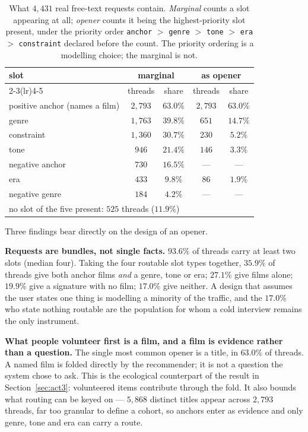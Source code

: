 \documentclass[11pt]{article}
\begin{document}
\begin{table}[t]
\centering
\caption{What $4{,}431$ real free-text requests contain. \emph{Marginal} counts a slot appearing at
all; \emph{opener} counts it being the highest-priority slot present, under the priority order
\texttt{anchor} $>$ \texttt{genre} $>$ \texttt{tone} $>$ \texttt{era} $>$ \texttt{constraint}
declared before the count. The priority ordering is a modelling choice; the marginal is not.}
\label{tab:opener_census}
\footnotesize
\begin{tabular}{lcc cc}
\toprule
slot & \multicolumn{2}{c}{marginal} & \multicolumn{2}{c}{as opener} \\
\cmidrule(lr){2-3}\cmidrule(lr){4-5}
 & threads & share & threads & share \\
\midrule
positive anchor (names a film) & $2{,}793$ & $63.0\%$ & $2{,}793$ & $63.0\%$ \\
genre                          & $1{,}763$ & $39.8\%$ & $651$     & $14.7\%$ \\
constraint                     & $1{,}360$ & $30.7\%$ & $230$     & $5.2\%$ \\
tone                           & $946$     & $21.4\%$ & $146$     & $3.3\%$ \\
negative anchor                & $730$     & $16.5\%$ & ---       & --- \\
era                            & $433$     & $9.8\%$  & $86$      & $1.9\%$ \\
negative genre                 & $184$     & $4.2\%$  & ---       & --- \\
\midrule
\multicolumn{5}{l}{no slot of the five present: $525$ threads ($11.9\%$)} \\
\bottomrule
\end{tabular}
\end{table}

Three findings bear directly on the design of an opener.

\textbf{Requests are bundles, not single facts.} $93.6\%$ of threads carry at least two slots
(median four). Taking the four routable slot types together, $35.9\%$ of threads give both anchor
films \emph{and} a genre, tone or era; $27.1\%$ give films alone; $19.9\%$ give a signature with no
film; $17.0\%$ give neither. A design that assumes the user states one thing is modelling a minority
of the traffic, and the $17.0\%$ who state nothing routable are the population for whom a cold
interview remains the only instrument.

\textbf{What people volunteer first is a film, and a film is evidence rather than a question.} The
single most common opener is a title, in $63.0\%$ of threads. A named film is folded directly by the
recommender; it is not a question the system chose to ask. This is the ecological counterpart of the
result in Section~\ref{sec:act3}: volunteered items contribute through the fold. It also bounds what
routing can be keyed on --- $5{,}868$ distinct titles appear across $2{,}793$ threads, far too
granular to define a cohort, so anchors enter as evidence and only genre, tone and era can carry a
route.
\end{document}
